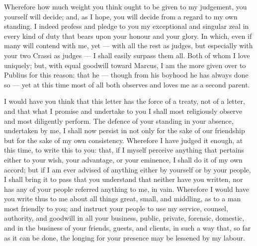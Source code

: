  Wherefore how much weight you think ought to be given to my judgement, you yourself will decide; and, as I hope, you will decide from a regard to my own standing. I indeed profess and pledge to you my exceptional and singular zeal in every kind of duty that bears upon your honour and your glory. In which, even if many will contend with me, yet --- with all the rest as judges, but especially with your two Crassi as judges --- I shall easily surpass them all. Both of whom I love uniquely; but, with equal goodwill toward Marcus, I am the more given over to Publius for this reason: that he --- though from his boyhood he has always done so --- yet at this time most of all both observes and loves me as a second parent.

 I would have you think that this letter has the force of a treaty, not of a letter, and that what I promise and undertake to you I shall most religiously observe and most diligently perform. The defence of your standing in your absence, undertaken by me, I shall now persist in not only for the sake of our friendship but for the sake of my own consistency. Wherefore I have judged it enough, at this time, to write this to you: that, if I myself perceive anything that pertains either to your wish, your advantage, or your eminence, I shall do it of my own accord; but if I am ever advised of anything either by yourself or by your people, I shall bring it to pass that you understand that neither have you written, nor has any of your people referred anything to me, in vain. Wherefore I would have you write thus to me about all things great, small, and middling, as to a man most friendly to you; and instruct your people to use my service, counsel, authority, and goodwill in all your business, public, private, forensic, domestic, and in the business of your friends, guests, and clients, in such a way that, so far as it can be done, the longing for your presence may be lessened by my labour.
